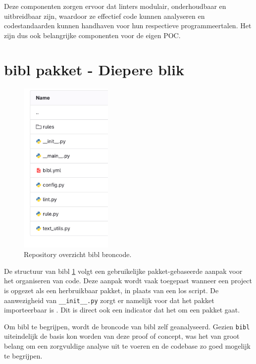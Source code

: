 Deze componenten zorgen ervoor dat linters modulair, onderhoudbaar en uitbreidbaar zijn, waardoor ze effectief code kunnen analyseren en codestandaarden kunnen handhaven voor hun respectieve programmeertalen. Het zijn dus ook belangrijke componenten voor de eigen \acrlong{POC}.


\section{bibl pakket - Diepere blik}
\label{sec:bibl-in-depth}
\begin{figure}[ht]
    \centering
    \includegraphics[width=0.4\textwidth]{./files/bibl_src.png}
    \caption[bibl repository - Source code]{Repository overzicht bibl broncode.}
    \label{fig:bibl_src}
\end{figure}

De structuur van bibl \ref{fig:bibl_src} volgt een gebruikelijke pakket-gebaseerde aanpak voor het organiseren van code. Deze aanpak wordt vaak toegepast wanneer een project is opgezet als een herbruikbaar pakket, in plaats van een los script. De aanwezigheid van \texttt{\_\_init\_\_.py} zorgt er namelijk voor dat het pakket importeerbaar is \autocite{Loubser2021}. Dit is direct ook een indicator dat het om een pakket gaat.

Om bibl te begrijpen, wordt de broncode van bibl zelf geanalyseerd. Gezien \texttt{bibl} uiteindelijk de basis kon worden van deze proof of concept, was het van groot belang om een zorgvuldige analyse uit te voeren en de codebase zo goed mogelijk te begrijpen.

